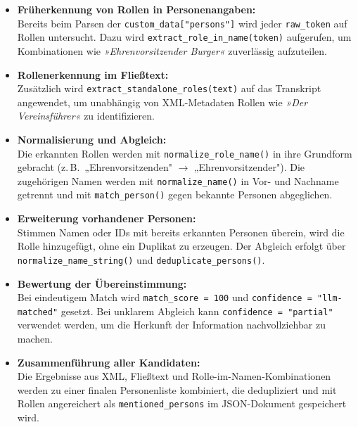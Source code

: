\documentclass{article}
\begin{document}
\begin{itemize}
    \item \textbf{Früherkennung von Rollen in Personenangaben:} \\ Bereits beim Parsen der \texttt{custom\_data["persons"]} wird jeder \texttt{raw\_token} auf Rollen untersucht. Dazu wird \texttt{extract\_role\_in\_name(token)} aufgerufen, um Kombinationen wie \textit{»Ehrenvorsitzender Burger«} zuverlässig aufzuteilen.

    \item \textbf{Rollenerkennung im Fließtext:} \\Zusätzlich wird \texttt{extract\_standalone\_roles(text)} auf das Transkript angewendet, um unabhängig von XML-Metadaten Rollen wie \textit{»Der Vereinsführer«} zu identifizieren.

    \item \textbf{Normalisierung und Abgleich:} \\Die erkannten Rollen werden mit \texttt{normalize\_role\_name()} in ihre Grundform gebracht (z.\,B.\ „Ehrenvorsitzenden" $\rightarrow$ „Ehrenvorsitzender"). Die zugehörigen Namen werden mit \texttt{normalize\_name()} in Vor- und Nachname getrennt und mit \texttt{match\_person()} gegen bekannte Personen abgeglichen.

    \item \textbf{Erweiterung vorhandener Personen:} \\Stimmen Namen oder IDs mit bereits erkannten Personen überein, wird die Rolle hinzugefügt, ohne ein Duplikat zu erzeugen. Der Abgleich erfolgt über \texttt{normalize\_name\_string()} und \texttt{deduplicate\_persons()}.

    \item \textbf{Bewertung der Übereinstimmung:} \\Bei eindeutigem Match wird \texttt{match\_score = 100} und \texttt{confidence = "llm-matched"} gesetzt. Bei unklarem Abgleich kann \texttt{confidence = "partial"} verwendet werden, um die Herkunft der Information nachvollziehbar zu machen.

    \item \textbf{Zusammenführung aller Kandidaten:} \\Die Ergebnisse aus XML, Fließtext und Rolle-im-Namen-Kombinationen werden zu einer finalen Personenliste kombiniert, die dedupliziert und mit Rollen angereichert als \texttt{mentioned\_persons} im JSON-Dokument gespeichert wird.
\end{itemize}
\end{document}

